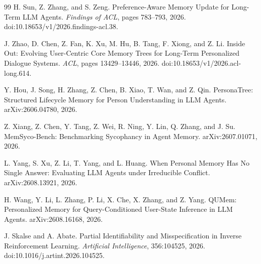 \documentclass[11pt]{article}
\begin{document}
\begin{thebibliography}{99}
H. Sun, Z. Zhang, and S. Zeng.
\newblock Preference-Aware Memory Update for Long-Term LLM Agents.
\newblock \emph{Findings of ACL}, pages 783--793, 2026.
\newblock doi:10.18653/v1/2026.findings-acl.38.

J. Zhao, D. Chen, Z. Fan, K. Xu, M. Hu, B. Tang, F. Xiong, and Z. Li.
\newblock Inside Out: Evolving User-Centric Core Memory Trees for Long-Term Personalized Dialogue Systems.
\newblock \emph{ACL}, pages 13429--13446, 2026.
\newblock doi:10.18653/v1/2026.acl-long.614.

Y. Hou, J. Song, H. Zhang, Z. Chen, B. Xiao, T. Wan, and Z. Qin.
\newblock PersonaTree: Structured Lifecycle Memory for Person Understanding in LLM Agents.
\newblock arXiv:2606.04780, 2026.

Z. Xiang, Z. Chen, Y. Tang, Z. Wei, R. Ning, Y. Lin, Q. Zhang, and J. Su.
\newblock MemSyco-Bench: Benchmarking Sycophancy in Agent Memory.
\newblock arXiv:2607.01071, 2026.

L. Yang, S. Xu, Z. Li, T. Yang, and L. Huang.
\newblock When Personal Memory Has No Single Answer: Evaluating LLM Agents under Irreducible Conflict.
\newblock arXiv:2608.13921, 2026.

H. Wang, Y. Li, L. Zhang, P. Li, X. Che, X. Zhang, and Z. Yang.
\newblock QUMem: Personalized Memory for Query-Conditioned User-State Inference in LLM Agents.
\newblock arXiv:2608.16168, 2026.

J. Skalse and A. Abate.
\newblock Partial Identifiability and Misspecification in Inverse Reinforcement Learning.
\newblock \emph{Artificial Intelligence}, 356:104525, 2026.
\newblock doi:10.1016/j.artint.2026.104525.

\end{thebibliography}
\end{document}
